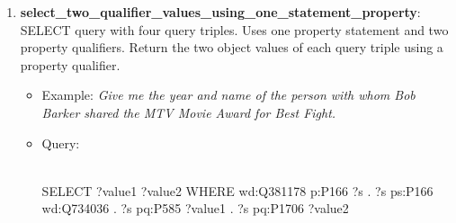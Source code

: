 \begin{enumerate}
    \item \textbf{select\_two\_qualifier\_values\_using\_one\_statement\_property}: SELECT query 
    with four query triples. Uses one property statement and two property qualifiers. Return the two object 
    values of each query triple using a property qualifier.
    \begin{itemize}
        \item Example: \textit{Give me the year and name of the person with whom Bob Barker shared the 
        MTV Movie Award for Best Fight.}
        \item Query:\\
        \mbox{}\\
        \begin{sparqlcode}[]
SELECT ?value1 ?value2 WHERE { 
    wd:Q381178 p:P166 ?s . 
    ?s ps:P166 wd:Q734036 . 
    ?s pq:P585 ?value1 . 
    ?s pq:P1706 ?value2 
}
        \end{sparqlcode}
    \end{itemize}
    
\end{enumerate}